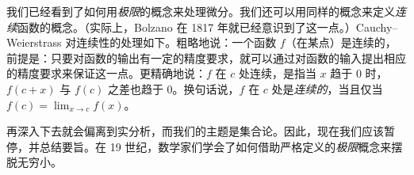 \documentclass[../../../include/open-logic-section]{subfiles}
\begin{document}
我们已经看到了如何用\emph{极限}的概念来处理微分。我们还可以用同样的概念来定义\emph{连续}函数的概念。（实际上，Bolzano 在 1817 年就已经意识到了这一点。）Cauchy--Weierstrass 对连续性的处理如下。粗略地说：一个函数 $f$（在某点）是连续的，前提是：只要对函数的输出有一定的精度要求，就可以通过对函数的输入提出相应的精度要求来保证这一点。更精确地说：$f$ 在 $c$ 处连续，是指当 $x$ 趋于 $0$ 时，$f(c + x)$ 与 $f(c)$ 之差也趋于 $0$。换句话说，$f$ 在 $c$ 处是\emph{连续的}，当且仅当 $f(c) = \lim_{x \rightarrow c} f(x)$。

再深入下去就会偏离到实分析，而我们的主题是集合论。因此，现在我们应该暂停，并总结要旨。在 19 世纪，数学家们学会了如何借助严格定义的\emph{极限}概念来摆脱无穷小。
\end{document}
